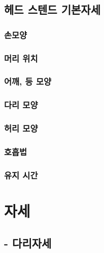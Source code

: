 \documentclass[12pt, a4paper, oneside]{book}
\let\stdsection\section
\renewcommand\section{\newpage\stdsection}
\begin{document}
		\section{헤드 스텐드 기본자세}

		\subsection{손모양}
		\subsection{머리 위치 }
		\subsection{어깨, 등 모양}
		\subsection{다리 모양}
		\subsection{허리 모양}
		\subsection{호흡법}
		\subsection{유지 시간}

	\chapter{자세}
	\newpage
	\minitoc

%
	\section{ - 다리자세}
\end{document}
